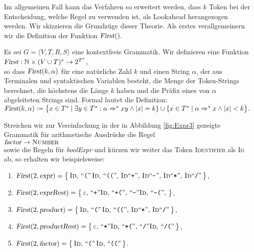 Im allgemeinen Fall kann das Verfahren so erweitert werden, dass $k$ Token bei der Entscheidung,
welche Regel zu verwenden ist, als Lookahead herangezogen werden.  
Wir skizzieren die Grundzüge dieser Theorie.
Als erstes verallgemeinern wir die Definition der Funktion $\textsl{First}()$.  

\begin{Definition}
  Es sei $G = \langle V, T, R, S \rangle$ eine kontextfreie Grammatik. Wir definieren eine Funktion
  \\[0.2cm]
  \hspace*{1.3cm}
  $\textsl{First}: \mathbb{N} \times (V \cup T)^* \rightarrow 2^{T^*}$,
  \\[0.2cm]
  so dass $\textsl{First}(k,\alpha)$ für eine natürliche Zahl $k$ und einen String $\alpha$, der aus
  Terminalen und syntaktischen Variablen besteht, die Menge der Token-Strings berechnet, die
  höchstens die Länge $k$ haben und die Präfix eines von $\alpha$ abgeleiteten Strings sind.  Formal
  lautet die Definition:
  \\[0.2cm]
  \hspace*{1.3cm}
  $\textsl{First}(k, \alpha) := 
  \bigl\{ x \in T^* \mid \exists y \in T^*: \alpha \Rightarrow^* x y \wedge |x| = k \} \cup
  \{ x \in T^* \mid \alpha \Rightarrow^* x \wedge |x| < k \bigr\}.$ \eox
\end{Definition}

\example
Streichen wir zur Vereinfachung in der in Abbildung \ref{fig:Expr3} gezeigte Grammatik 
für arithmetische Ausdrücke die Regel 
\\[0.2cm]
\hspace*{1.3cm}
$\textsl{factor} \rightarrow \textsc{Number}$
\\[0.2cm]
sowie die Regeln für \textsl{boolExpr}
und kürzen wir weiter das Token \textsc{Identifier} als \textsc{Id} ab, so erhalten wir
beispielsweise:
\begin{enumerate}
\item $\textsl{First}(2, \textsl{expr}) = 
      \bigl\{\, \textsc{Id}, \,\mbox{``\texttt{(}''}\, \textsc{Id},\, \mbox{``\texttt{((}''},\,
      \textsc{Id} \mbox{``\texttt{+}''},\, \textsc{Id} \mbox{``\texttt{-}''},\,
      \textsc{Id} \mbox{``\texttt{*}''},\, \textsc{Id} \mbox{``\texttt{/}''}\,
      \bigr\}$,
\item $\textsl{First}(2, \textsl{exprRest}) = 
      \bigl\{\,
      \varepsilon,\,
      \mbox{``\texttt{+}''}\textsc{Id},\, 
      \mbox{``\texttt{+(}''},\, 
      \mbox{``\texttt{-}''} \textsc{Id},\,
      \mbox{``\texttt{-(}''},\,
      \bigr\}$,
\item $\textsl{First}(2, \textsl{product}) = 
      \bigl\{\, \textsc{Id}, \,\mbox{``\texttt{(}''}\, \textsc{Id},\, \mbox{``\texttt{((}''},\,
      \textsc{Id} \mbox{``\texttt{*}''},\, \textsc{Id} \mbox{``\texttt{/}''}\,
      \bigr\}$,
\item $\textsl{First}(2, \textsl{productRest}) = 
      \bigl\{\, 
      \varepsilon,\,
      \mbox{``\texttt{*}''}\textsc{Id},\, 
      \mbox{``\texttt{*(}''},\, 
      \mbox{``\texttt{/}''}\textsc{Id},\, 
      \mbox{``\texttt{/(}''}\, 
      \bigr\}$,
\item $\textsl{First}(2, \textsl{factor}) = 
      \bigl\{\, \textsc{Id}, \,\mbox{``\texttt{(}''}\, \textsc{Id},\, \mbox{``\texttt{((}''}\,
      \bigr\}$.
\end{enumerate}

